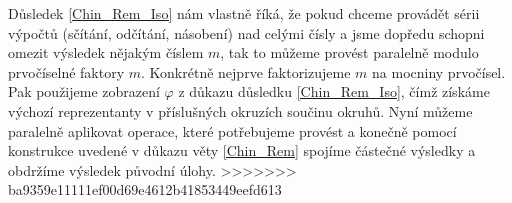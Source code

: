 Důsledek \ref{Chin_Rem_Iso} nám vlastně říká, že pokud chceme provádět sérii 
výpočtů (sčítání, odčítání, násobení) nad celými čísly a jsme dopředu schopni 
omezit výsledek nějakým číslem $ m $, tak to můžeme provést paralelně modulo
prvočíselné faktory $ m $. Konkrétně nejprve faktorizujeme $ m $ na mocniny
prvočísel. Pak použijeme zobrazení $ \varphi $ z důkazu důsledku \ref{Chin_Rem_Iso},
čímž získáme výchozí reprezentanty v příslušných okruzích součinu okruhů. 
Nyní můžeme paralelně aplikovat operace, které potřebujeme provést a konečně 
pomocí konstrukce uvedené v důkazu věty \ref{Chin_Rem} spojíme částečné výsledky
a obdržíme výsledek původní úlohy.
>>>>>>> ba9359e11111ef00d69e4612b41853449eefd613
